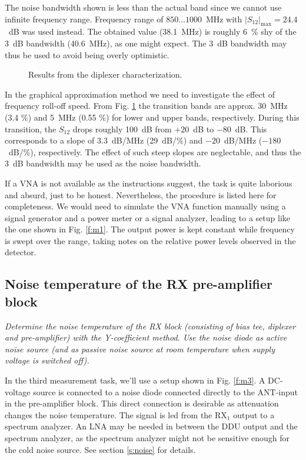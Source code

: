 \documentclass[a4paper, 12pt]{article}
\newlength{\oneLine}
\begin{document}
The noise bandwidth shown is less than the actual band since we cannot use infinite frequency 
range. Frequency range of $850 \ldots 1000$~MHz with $|S_{12}|_\mathrm{max} = 24.4$~dB 
was used instead. The obtained value (38.1~MHz) is roughly 6~\% shy of the 3~dB bandwidth 
(40.6~MHz), as one might expect. The 3~dB bandwidth may thus be used to avoid being 
overly optimistic.

\begin{figure}[h!]
	\begin{center}
	\caption{Results from the diplexer characterization.}
	\label{f:r1}
	\end{center}
	\vspace*{-12pt}
\end{figure}

In the graphical approximation method we need to investigate the effect of frequency 
roll-off speed. From Fig. \ref{f:r1} the transition bands are approx. 30~MHz (3.4 \%) 
and 5~MHz (0.55 \%) for lower and upper bands, respectively. During this transition, 
the $S_12$ drops roughly 100~dB from $+20$~dB to $-80$~dB. This corresponds to a slope 
of $3.3$~dB/MHz (29~dB/\%) and $-20$~dB/MHz ($-180$~dB/\%), respectively. The effect of 
such steep slopes are neglectable, and thus the 3~dB bandwidth may be used as the noise 
bandwidth.

If a VNA is not available as the instructions suggest, the task is quite laborious and 
absurd, just to be honest. Nevertheless, the procedure is listed here for completeness. 
We would need to simulate the VNA function manually using a signal generator and a power 
meter or a signal analyzer, leading to a setup like the one shown in Fig. \ref{f:m1}. The
output power is kept constant while frequency is swept over the range, taking notes on the 
relative power levels observed in the detector.


\subsection{Noise temperature of the RX pre-amplifier block}

\textit{Determine the noise temperature of the RX block (consisting of bias tee, 
diplexer and pre-amplifier) with the Y-coefficient method. Use the noise diode 
as active noise source (and as passive noise source at room temperature when 
supply voltage is switched off).}

\vspace*{\oneLine}
\noindent
In the third measurement task, we'll use a setup shown in Fig. \ref{f:m3}. 
A DC-voltage source is connected to a noise diode connected directly to the 
ANT-input in the pre-amplifier block. This direct connection is desirable as 
attenuation changes the noise temperature. The signal is led from the RX$_1$ 
output to a spectrum analyzer. An LNA may be needed in between the DDU output 
and the spectrum analyzer, as the spectrum analyzer might not be sensitive 
enough for the cold noise source. See section \ref{s:noise} for details.
\end{document}

